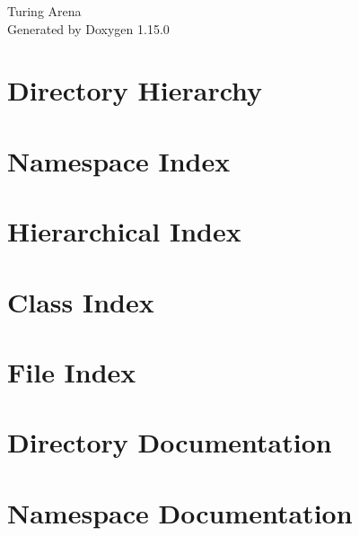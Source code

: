 \documentclass[twoside]{book}
\newcommand{\+}{\discretionary{\mbox{\scriptsize$\hookleftarrow$}}{}{}}
\newcommand{\clearemptydoublepage}{%
    \newpage{\pagestyle{empty}\cleardoublepage}%
  }
\begin{document}
  \raggedbottom
    \hypersetup{pageanchor=false,
                bookmarksnumbered=true,
                pdfencoding=unicode
               }
  \begin{titlepage}
  \vspace*{7cm}
  \begin{center}%
  {\Large Turing Arena}\\
  \vspace*{1cm}
  {\large Generated by Doxygen 1.15.0}\\
  \end{center}
  \end{titlepage}
  \clearemptydoublepage
  \tableofcontents
  \clearemptydoublepage
  \hypersetup{pageanchor=true}

\chapter{Directory Hierarchy}

\chapter{Namespace Index}

\chapter{Hierarchical Index}

\chapter{Class Index}

\chapter{File Index}

\chapter{Directory Documentation}


\chapter{Namespace Documentation}











\end{document}
